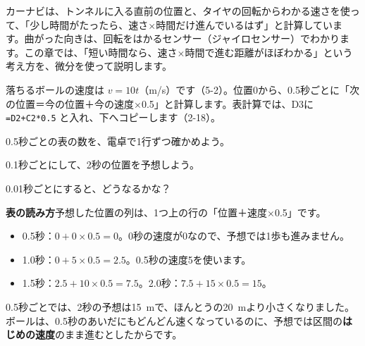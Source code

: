 カーナビは、トンネルに入る直前の位置と、タイヤの回転からわかる速さを使って、「少し時間がたったら、速さ×時間だけ進んでいるはず」と計算しています。曲がった向きは、回転をはかるセンサー（ジャイロセンサー）でわかります。この章では、「短い時間なら、速さ×時間で進む距離がほぼわかる」という考え方を、微分を使って説明します。

\clearpage
\begin{yattemiyou}
落ちるボールの速度は $v=10t$（m/s）です（5-2）。位置0から、0.5秒ごとに「次の位置＝今の位置＋今の速度×0.5」と計算します。表計算では、D3に \texttt{=D2+C2*0.5} と入れ、下へコピーします（2-18）。
\begin{bkcenter}
\end{bkcenter}
\begin{enumerate}[label={\bkcircled[bkGreen]{\arabic*}}, leftmargin=2.4\zw, itemsep=1pt, topsep=3pt]
\item 0.5秒ごとの表の数を、電卓で1行ずつ確かめよう。
\item 0.1秒ごとにして、2秒の位置を予想しよう。
\item 0.01秒ごとにすると、どうなるかな？
\end{enumerate}
\end{yattemiyou}

\noindent\textbf{表の読み方}\quad 予想した位置の列は、1つ上の行の「位置＋速度×0.5」です。
\begin{itemize}[leftmargin=1.6\zw, itemsep=1pt, topsep=2pt, label={\color{bkTheme}●}]
\item 0.5秒：$0+0\times0.5=0$。0秒の速度が0なので、予想では1歩も進みません。
\item 1.0秒：$0+5\times0.5=2.5$。0.5秒の速度5を使います。
\item 1.5秒：$2.5+10\times0.5=7.5$。\quad 2.0秒：$7.5+15\times0.5=15$。
\end{itemize}
0.5秒ごとでは、2秒の予想は\qty{15}{m}で、ほんとうの\qty{20}{m}より小さくなりました。ボールは、0.5秒のあいだにもどんどん速くなっているのに、予想では区間の\textbf{はじめの速度}のまま進むとしたからです。

